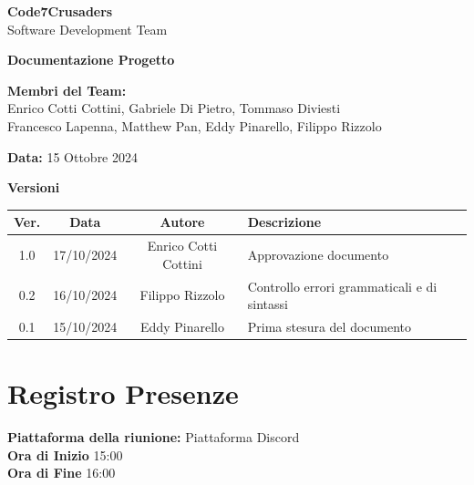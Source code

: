 \documentclass{article}
\begin{document}
\begin{titlepage}
    {\Huge \textbf{Code7Crusaders}}\\
    \vspace{0.5cm}
    {\Large Software Development Team}\\
    \vspace{2cm}
    
    {\large \textbf{Documentazione Progetto}}\\
    \vspace{5cm}

    \textbf{Membri del Team:}\\
    Enrico Cotti Cottini, Gabriele Di Pietro, Tommaso Diviesti \\
    Francesco Lapenna, Matthew Pan, Eddy Pinarello, Filippo Rizzolo \\
    \vspace{0.5cm}
    
    {\large \textbf{Data: }15 Ottobre 2024}     
    \vspace{1cm}
\end{titlepage}

\newpage
\begin{table}[h!]
\centering
\textbf{Versioni} \\ %
\vspace{2mm} %
\begin{tabular}{|c|c|c|l|}
    \hline
    \textbf{Ver.} & \textbf{Data} & \textbf{Autore} & \textbf{Descrizione} \\
    \hline
    1.0 & 17/10/2024 & Enrico Cotti Cottini & Approvazione documento \\ 
    \hline
    0.2 & 16/10/2024 & Filippo Rizzolo & Controllo errori grammaticali e di sintassi \\ 
    \hline
    0.1 & 15/10/2024 & Eddy Pinarello & Prima stesura del documento \\ 
    \hline
\end{tabular}
\end{table}



\newpage
\tableofcontents
\newpage

\section{Registro Presenze}
\textbf{Piattaforma della riunione:} Piattaforma Discord \\
\textbf{Ora di Inizio} 15:00\\
\textbf{Ora di Fine} 16:00
\vspace{10mm} 
\end{document}
